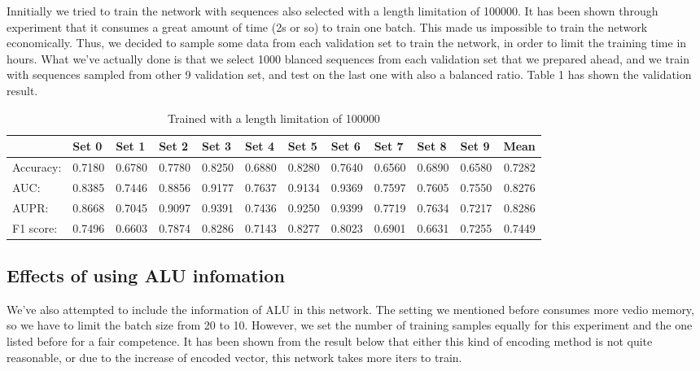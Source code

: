 \documentclass[10pt,a4paper]{article}
\begin{document}
\begin{spacing}{1.5}
		Innitially we tried to train the network with sequences also selected with a length limitation of 100000. It has been shown through experiment that it consumes a great amount of time (2s or so) to train one batch. This made us impossible to train the network economically. Thus, we decided to sample some data from each validation set to train the network, in order to limit the training time in hours. What we've actually done is that we select 1000 blanced sequences from each validation set that we prepared ahead, and we train with sequences sampled from other 9 validation set, and test on the last one with also a balanced ratio. Table 1 has shown the validation result.
		\begin{table}[H]
			\centering
			\caption{Trained with a length limitation of 100000}
			\begin{tabular}{l|rrrrrrrrrr|r}
				& \multicolumn{1}{l}{Set 0} & \multicolumn{1}{l}{Set 1} & \multicolumn{1}{l}{Set 2} & \multicolumn{1}{l}{Set 3} & \multicolumn{1}{l}{Set 4} & \multicolumn{1}{l}{Set 5} & \multicolumn{1}{l}{Set 6} & \multicolumn{1}{l}{Set 7} & \multicolumn{1}{l}{Set 8} & \multicolumn{1}{l}{Set 9} & \multicolumn{1}{l}{Mean} \\ \hline \hline
				Accuracy: & 0.7180  & 0.6780  & 0.7780  & 0.8250  & 0.6880  & 0.8280  & 0.7640  & 0.6560  & 0.6890  & 0.6580  & 0.7282  \\
				AUC:  & 0.8385  & 0.7446  & 0.8856  & 0.9177  & 0.7637  & 0.9134  & 0.9369  & 0.7597  & 0.7605  & 0.7550  & 0.8276  \\
				AUPR: & 0.8668  & 0.7045  & 0.9097  & 0.9391  & 0.7436  & 0.9250  & 0.9399  & 0.7719  & 0.7634  & 0.7217  & 0.8286  \\
				F1 score: & 0.7496  & 0.6603  & 0.7874  & 0.8286  & 0.7143  & 0.8277  & 0.8023  & 0.6901  & 0.6631  & 0.7255  & 0.7449  \\
			\end{tabular}%
			\label{tab:addlabel}%
		\end{table}%
		
		\subsection{Effects of using ALU infomation}
		
		We've also attempted to include the information of ALU in this network. The setting we mentioned before consumes more vedio memory, so we have to limit the batch size from 20 to 10. However, we set the number of training samples equally for this experiment and the one listed before for a fair competence. It has been shown from the result below that either this kind of encoding method is not quite reasonable, or due to the increase of encoded vector, this network takes more iters to train.
		

\end{spacing}
\end{document}
